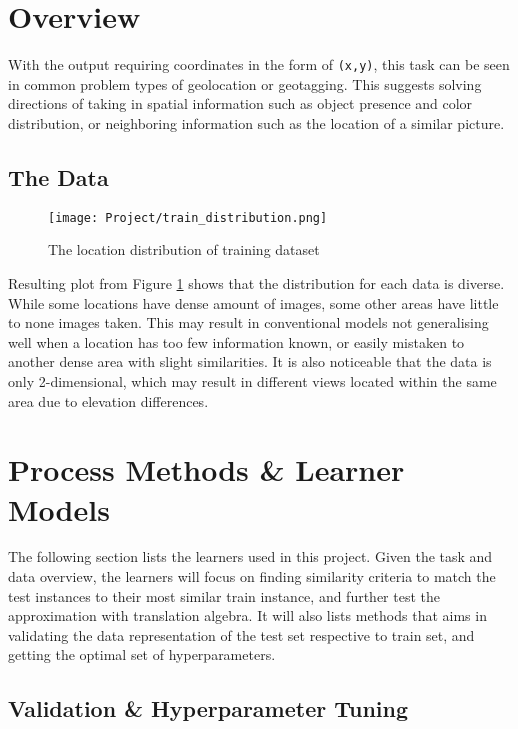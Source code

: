 \documentclass[11pt]{article}
\begin{document}
\begin{multicols}{2}
\section{Overview}
With the output requiring coordinates in the form of \texttt{(x,y)}, this task can be seen in common problem types of geolocation or geotagging. This suggests solving directions of taking in spatial information such as object presence and color distribution, or neighboring information such as the location of a similar picture.
\vspace{-0.2cm}
\subsection*{The Data}
\vspace{-0.5cm}
\begin{figure}[H]
    \centering
    \texttt{[image: Project/train\_distribution.png]}
    \caption{The location distribution of training dataset}
    \label{fig:train}
\end{figure}

\noindent Resulting plot from Figure \ref{fig:train} shows that the distribution for each data is diverse. While some locations have dense amount of images, some other areas have little to none images taken. This may result in conventional models not generalising well when a location has too few information known, or easily mistaken to another dense area with slight similarities. It is also noticeable that the data is only 2-dimensional, which may result in different views located within the same area due to elevation differences.

\section{Process Methods \& Learner Models}
\noindent The following section lists the learners used in this project. Given the task and data overview, the learners will focus on finding similarity criteria to match the test instances to their most similar train instance, and further test the approximation with translation algebra. It will also lists methods that aims in validating the data representation of the test set respective to train set, and getting the optimal set of hyperparameters.


\vspace{-0.4cm}
\subsection{Validation \& Hyperparameter Tuning}


\end{multicols}
\end{document}
